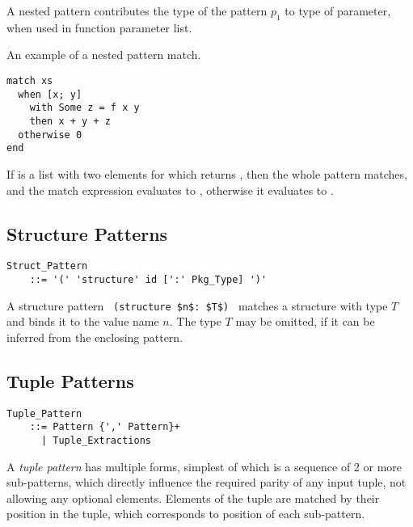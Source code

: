 A nested pattern contributes the type of the pattern $p_1$ to type of parameter, when used in function parameter list. 

\example An example of a nested pattern match.
\begin{lstlisting}
match xs
  when [x; y] 
    with Some z = f x y 
    then x + y + z
  otherwise 0
end
\end{lstlisting}
If  is a list with two elements for which  returns , then the whole pattern matches, and the match expression evaluates to , otherwise it evaluates to . 





\subsection{Structure Patterns}
\label{sec:structure-patterns}

\grammar\begin{lstlisting}
Struct_Pattern 
    ::= '(' 'structure' id [':' Pkg_Type] ')'
\end{lstlisting}

A structure pattern ~\lstinline!(structure $n$: $T$)!~ matches a structure with type $T$ and binds it to the value name $n$. The type $T$ may be omitted, if it can be inferred from the enclosing pattern. 










\subsection{Tuple Patterns}
\label{sec:tuple-patterns}

\grammar\begin{lstlisting}
Tuple_Pattern 
    ::= Pattern {',' Pattern}+
      | Tuple_Extractions
\end{lstlisting}

A {\em tuple pattern} has multiple forms, simplest of which is a sequence of 2 or more sub-patterns, which directly influence the required parity of any input tuple, not allowing any optional elements. Elements of the tuple are matched by their position in the tuple, which corresponds to position of each sub-pattern. 

